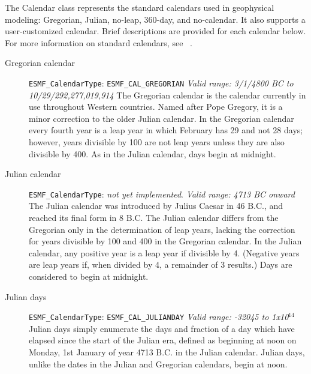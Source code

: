 
\label{sec:Calendar}
The Calendar class represents the standard calendars used in 
geophysical modeling:  Gregorian, Julian, no-leap, 360-day, and 
no-calendar.  It also supports a user-customized calendar.  Brief 
descriptions are provided for each calendar below.  For more information 
on standard calendars, see ~\cite{seidelman}.

\begin{description}            
\item[Gregorian calendar]  
{\tt ESMF\_CalendarType}: {\tt ESMF\_CAL\_GREGORIAN} \newline
{\it Valid range: 3/1/4800 BC to 10/29/292,277,019,914 } \newline
The Gregorian calendar is the calendar currently in use throughout Western
countries.  Named after Pope Gregory, it is a minor 
correction to the older Julian calendar. In the Gregorian calendar every
fourth year is a leap year in which February has 29 and not 28 days;
however, years divisible by 100 are not leap years unless they are also 
divisible  by 400.  As in the Julian calendar, days begin at midnight.

\item[Julian calendar]
{\tt ESMF\_CalendarType}:  {\it not yet implemented}. \newline
{\it Valid range: 4713 BC onward} \newline
The Julian calendar was introduced by Julius Caesar in 46 B.C., and 
reached its final form in 8 B.C.  The Julian calendar differs from the 
Gregorian only in the determination of leap years, lacking the correction 
for years divisible
by 100 and 400 in the Gregorian calendar. In the Julian calendar, any positive 
year is a leap year if divisible by 4. (Negative years are leap years if, when 
divided by 4, a remainder of 3 results.) Days are considered to begin at 
midnight.

\item[Julian days]
{\tt ESMF\_CalendarType}:  {\tt ESMF\_CAL\_JULIANDAY} \newline
{\it Valid range: -32045 to 1x10$^{14}$} \newline
Julian days simply enumerate the days and fraction of a day which have elapsed 
since the start of the Julian era, defined as beginning at noon on Monday, 
1st January of year 4713 B.C. in the Julian calendar.  Julian days, 
unlike the dates in the Julian and Gregorian calendars, begin at noon.


\end{description}
